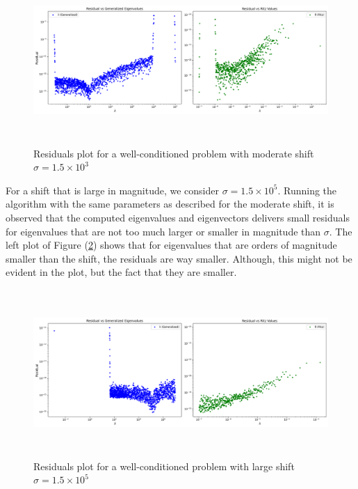 \begin{figure}
	\centering
	\caption{Residuals plot for a well-conditioned problem with moderate shift $\sigma=1.5 \times 10^3$}
	\includegraphics[height=2.5in]{./Plots/LU/residuals_plot_well_mod.png}
	
	\label{fig:LUResidualsModShift}
\end{figure}

For a shift that is large in magnitude, we consider $\sigma = 1.5 \times 10^5$. Running the algorithm with the same parameters as described for the moderate shift, it is observed that the computed eigenvalues and eigenvectors delivers small residuals for eigenvalues that are not too much larger or smaller in magnitude than $\sigma$. The left plot of Figure (\ref{fig:LUResidualsLargeShift}) shows that for eigenvalues that are orders of magnitude smaller than the shift, the residuals are way smaller. Although, this might not be evident in the plot, but the fact that they are smaller.


\begin{figure}
	\centering
	\caption{Residuals plot for a well-conditioned problem with large shift $\sigma=1.5 \times 10^5$}
	\includegraphics[height=2.5in]{./Plots/LU/residuals_plot_well_large.png}
	
	\label{fig:LUResidualsLargeShift}
\end{figure}



